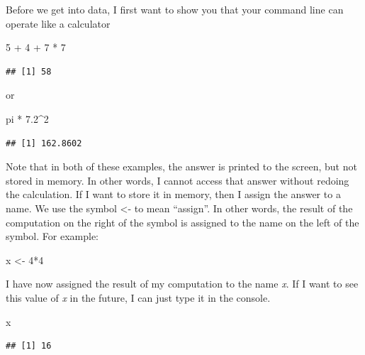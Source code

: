 \documentclass[]{book}
\newenvironment{Shaded}{\begin{snugshade}}{\end{snugshade}}
\newcommand{\DecValTok}[1]{\textcolor[rgb]{0.00,0.00,0.81}{{#1}}}
\newcommand{\FloatTok}[1]{\textcolor[rgb]{0.00,0.00,0.81}{{#1}}}
\newcommand{\StringTok}[1]{\textcolor[rgb]{0.31,0.60,0.02}{{#1}}}
\newcommand{\NormalTok}[1]{{#1}}
\begin{document}
Before we get into data, I first want to show you that your command line
can operate like a calculator

\begin{Shaded}
\begin{Highlighting}[]
\DecValTok{5} \NormalTok{+}\StringTok{ }\DecValTok{4} \NormalTok{+}\StringTok{ }\DecValTok{7} \NormalTok{*}\StringTok{ }\DecValTok{7}
\end{Highlighting}
\end{Shaded}

\begin{verbatim}
## [1] 58
\end{verbatim}

or

\begin{Shaded}
\begin{Highlighting}[]
\NormalTok{pi *}\StringTok{ }\FloatTok{7.2}\NormalTok{^}\DecValTok{2}
\end{Highlighting}
\end{Shaded}

\begin{verbatim}
## [1] 162.8602
\end{verbatim}

Note that in both of these examples, the answer is printed to the
screen, but not stored in memory. In other words, I cannot access that
answer without redoing the calculation. If I want to store it in memory,
then I assign the answer to a name. We use the symbol \textless{}- to
mean ``assign''. In other words, the result of the computation on the
right of the symbol is assigned to the name on the left of the symbol.
For example:

\begin{Shaded}
\begin{Highlighting}[]
\NormalTok{x <-}\StringTok{ }\DecValTok{4}\NormalTok{*}\DecValTok{4}
\end{Highlighting}
\end{Shaded}

I have now assigned the result of my computation to the name \emph{x}.
If I want to see this value of \emph{x} in the future, I can just type
it in the console.

\begin{Shaded}
\begin{Highlighting}[]
\NormalTok{x}
\end{Highlighting}
\end{Shaded}

\begin{verbatim}
## [1] 16
\end{verbatim}
\end{document}

